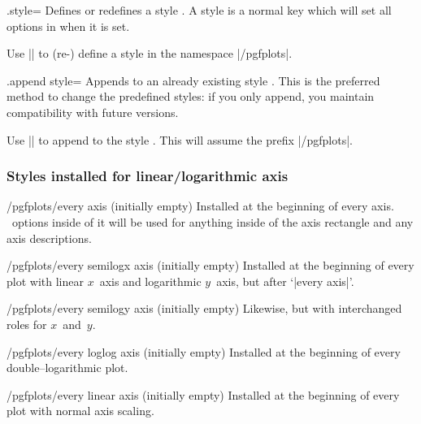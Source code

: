 \begin{handler}{{.style}=}
	Defines or redefines a style . A style is a normal key which will set all options in  when it is set.

	Use	|| to (re-) define a style  in the namespace |/pgfplots|.
\end{handler}

\begin{handler}{{.append style}=}
	Appends  to an already existing style . This is the preferred method to change the predefined styles: if you only append, you maintain compatibility with future versions.

	Use	|| to append  to the style . This will assume the prefix |/pgfplots|.
\end{handler}

\subsubsection*{Styles installed for linear/logarithmic axis}

\begin{stylekey}{/pgfplots/every axis (initially empty)}
 Installed at the beginning of every axis. \Tikz\ options inside of it will be used for anything inside of the axis rectangle and any axis descriptions.
\end{stylekey}

\begin{stylekey}{/pgfplots/every semilogx axis (initially empty)}
 Installed at the beginning of every plot with linear $x$~axis and logarithmic $y$~axis, but after `|every axis|'.
\end{stylekey}

\begin{stylekey}{/pgfplots/every semilogy axis (initially empty)}
 Likewise, but with interchanged roles for $x$~and~$y$.
\end{stylekey}

\begin{stylekey}{/pgfplots/every loglog axis (initially empty)}
 Installed at the beginning of every double--logarithmic plot.
\end{stylekey}

\begin{stylekey}{/pgfplots/every linear axis (initially empty)}
 Installed at the beginning of every plot with normal axis scaling.
\end{stylekey}

